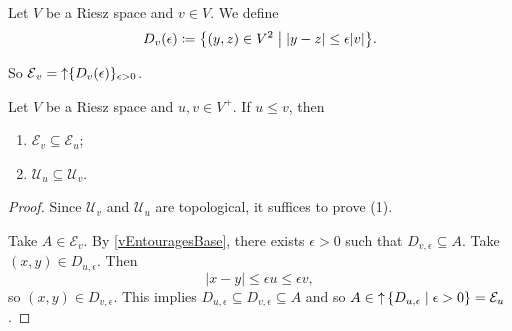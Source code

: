 \begin{definition}
Let $V$ be a Riesz space and $v\in V$. We define
\[ D_v(\epsilon) \defeq \setbuilder{(y,z)\in V^2}{|y-z| \leq \epsilon |v|}. \]
\end{definition}
So $\operatorname{\mathcal{E}}_v = \operatorname{\uparrow} \{D_v(\epsilon)\}_{\epsilon > 0}$.

\begin{lemma}
Let $V$ be a Riesz space and $u,v\in V^+$. If $u\leq v$, then
\begin{enumerate}
\item $\mathcal{E}_v \subseteq \mathcal{E}_u$;
\item $\mathcal{U}_u \subseteq \mathcal{U}_v$.
\end{enumerate}
\end{lemma}
\begin{proof}
Since $\mathcal{U}_v$ and $\mathcal{U}_u$ are topological, it suffices to prove (1).

Take $A \in \mathcal{E}_v$. By \ref{vEntouragesBase}, there exists $\epsilon > 0$ such that $D_{v,\epsilon} \subseteq A$. Take $(x,y) \in D_{u,\epsilon}$. Then
\[ |x-y| \leq \epsilon u \leq \epsilon v, \]
so $(x,y)\in D_{v,\epsilon}$. This implies $D_{u,\epsilon} \subseteq D_{v,\epsilon} \subseteq A$ and so $A\in \upset\setbuilder{D_{u,\epsilon}}{\epsilon >0} = \mathcal{E}_u$.
\end{proof}

